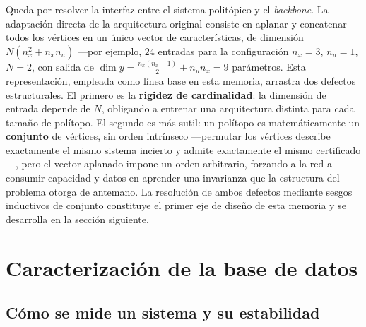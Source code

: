 Queda por resolver la interfaz entre el sistema politópico y el \textit{backbone}. La 
adaptación directa de la arquitectura original consiste en aplanar y concatenar todos 
los vértices en un único vector de características, de dimensión $N(n_x^2 + n_x n_u)$ 
---por ejemplo, $24$ entradas para la configuración $n_x = 3$, $n_u = 1$, $N = 2$, con 
salida de $\dim y = \frac{n_x(n_x+1)}{2} + n_u n_x = 9$ parámetros. Esta 
representación, empleada como línea base en esta memoria, arrastra dos defectos 
estructurales. El primero es la \textbf{rigidez de cardinalidad}: la dimensión de 
entrada depende de $N$, obligando a entrenar una arquitectura distinta para cada 
tamaño de polítopo. El segundo es más sutil: un polítopo es matemáticamente un 
\textbf{conjunto} de vértices, sin orden intrínseco ---permutar los vértices describe 
exactamente el mismo sistema incierto y admite exactamente el mismo certificado---, 
pero el vector aplanado impone un orden arbitrario, forzando a la red a consumir 
capacidad y datos en aprender una invarianza que la estructura del problema otorga de 
antemano. La resolución de ambos defectos mediante sesgos inductivos de conjunto 
constituye el primer eje de diseño de esta memoria y se desarrolla en la sección 
siguiente.














\section{Caracterización de la base de datos}
\label{sec:analisis-db}


\subsection{Cómo se mide un sistema y su estabilidad}
\label{sec:db-conceptos}



